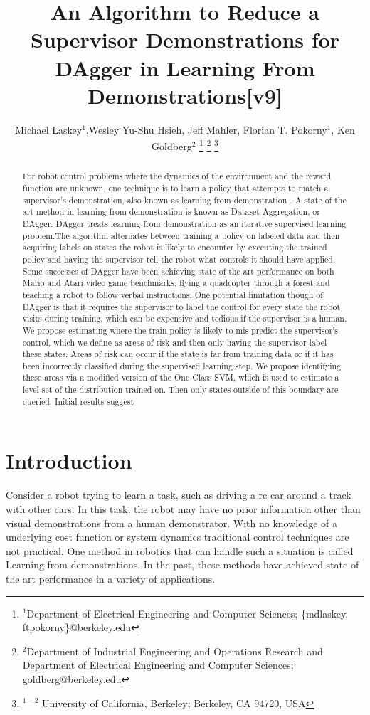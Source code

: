 \documentclass[10pt, conference]{ieeeconf}      %
\title{\LARGE \bf
An Algorithm to Reduce a Supervisor Demonstrations for DAgger in Learning From Demonstrations[v9] }
\author{Michael Laskey$^1$,Wesley Yu-Shu Hsieh, Jeff Mahler, Florian T. Pokorny$^1$, Ken Goldberg$^2$%
\thanks{$^1$Department of Electrical Engineering and Computer Sciences; {\small \{mdlaskey, ftpokorny\}@berkeley.edu}}%
\thanks{$^2$Department of Industrial Engineering and Operations Research and Department of Electrical Engineering and Computer Sciences; {\small goldberg@berkeley.edu}}%
\thanks{$^{1-2}$ University of California, Berkeley;  Berkeley, CA 94720, USA}%
}
\begin{document}
\maketitle
\thispagestyle{empty}
\pagestyle{empty}



\begin{abstract}
For robot control problems where the dynamics of the environment and the reward function are unknown, one technique is to learn a policy that attempts to match a supervisor's demonstration, also known as learning from demonstration . A state of the art method in learning from demonstration is known as Dataset Aggregation, or DAgger. DAgger treats learning from demonstration as an iterative supervised learning problem.The algorithm alternates between training a policy on labeled data and then acquiring labels on states the robot is likely to encounter by executing the trained policy and having the supervisor tell the robot what controls it should have applied. Some successes of DAgger have been achieving state of the art performance on both Mario and Atari video game benchmarks, flying a quadcopter through a forest and teaching a robot to follow verbal instructions. One potential limitation though of DAgger is that it requires the supervisor to label the control for every state the robot visits during training, which can be expensive and tedious if the supervisor is a human. We propose estimating where the train policy is likely to mis-predict the supervisor's control, which we define as areas of risk and then only having the supervisor label these states. Areas of risk can occur if the state is far from training data or if it has been incorrectly classified during the supervised learning step. We propose identifying these areas via a modified version of the One Class SVM, which is used to estimate a level set of the distribution trained on. Then only states outside of this boundary are queried. Initial results suggest 

\end{abstract}



\section{Introduction}
 Consider a robot trying to learn a task, such as driving a rc car around a track with other cars. In this task, the robot may have no prior information other than visual demonstrations from a human demonstrator. With no knowledge of a underlying cost function or system dynamics traditional control techniques are not practical.  One method in robotics that can handle such a situation is called Learning from demonstrations.  In the past, these methods  have  achieved state of the art performance  in a variety of applications.\cite{ross2013learning,pomerleau1989alvinn,schulman2013case} 
\end{document}
